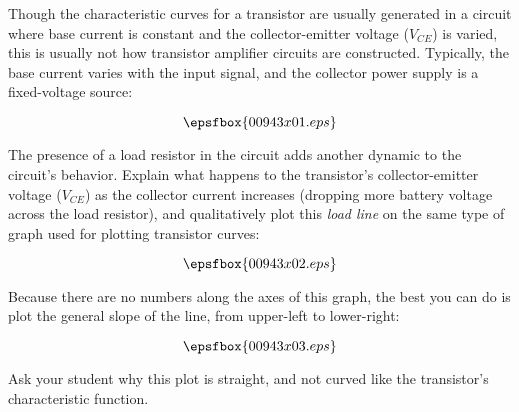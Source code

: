 

Though the characteristic curves for a transistor are usually generated in a circuit where base current is constant and the collector-emitter voltage ($V_{CE}$) is varied, this is usually not how transistor amplifier circuits are constructed.  Typically, the base current varies with the input signal, and the collector power supply is a fixed-voltage source:

$$\epsfbox{00943x01.eps}$$

The presence of a load resistor in the circuit adds another dynamic to the circuit's behavior.  Explain what happens to the transistor's collector-emitter voltage ($V_{CE}$) as the collector current increases (dropping more battery voltage across the load resistor), and qualitatively plot this {\it load line} on the same type of graph used for plotting transistor curves:

$$\epsfbox{00943x02.eps}$$







Because there are no numbers along the axes of this graph, the best you can do is plot the general slope of the line, from upper-left to lower-right:

$$\epsfbox{00943x03.eps}$$







Ask your student why this plot is straight, and not curved like the transistor's characteristic function.




